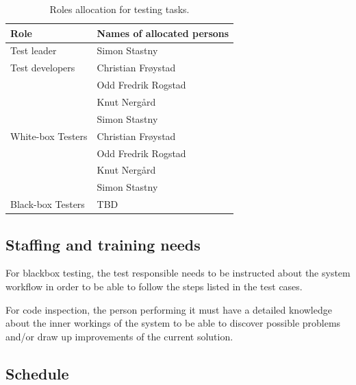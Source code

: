 \documentclass[11pt]{book}
\begin{document}
\begin{table}[H]
    \centering
    \begin{tabular}{| l | l |}
        \hline
        Role                & Names of allocated persons    \\ \hline

        Test leader         & Simon Stastny                 \\ \hline

        Test developers     & Christian Frøystad            \\
                            & Odd Fredrik Rogstad           \\
                            & Knut Nergård                  \\
                            & Simon Stastny                 \\ \hline

        White-box Testers   & Christian Frøystad            \\
                            & Odd Fredrik Rogstad           \\
                            & Knut Nergård                  \\
                            & Simon Stastny                 \\ \hline

        Black-box Testers   & TBD                           \\ \hline %
    \end{tabular}
    \caption{Roles allocation for testing tasks.}
    \label{tab:test_plan_roles_allocation}
\end{table}

\subsection{Staffing and training needs}
For blackbox testing, the test responsible needs to be instructed about the system workflow in order to be able to follow the steps listed in the test cases.

For code inspection, the person performing it must have a detailed knowledge about the inner workings of the system to be able to discover possible problems and/or draw up improvements of the current solution.


\subsection{Schedule}
\end{document}
